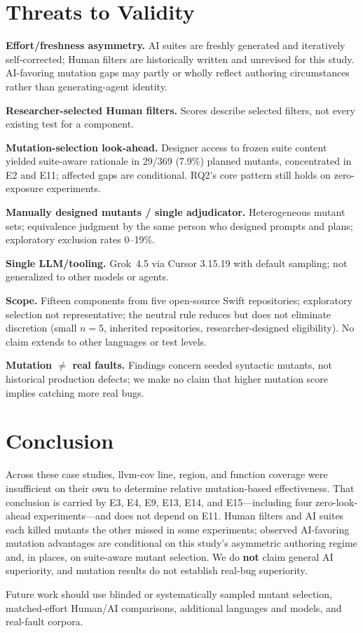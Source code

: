 \documentclass[10pt,conference]{IEEEtran}
\begin{document}
\section{Threats to Validity}
\textbf{Effort/freshness asymmetry.} AI suites are freshly generated and iteratively self-corrected; Human filters are historically written and unrevised for this study. AI-favoring mutation gaps may partly or wholly reflect authoring circumstances rather than generating-agent identity.

\textbf{Researcher-selected Human filters.} Scores describe selected filters, not every existing test for a component.

\textbf{Mutation-selection look-ahead.} Designer access to frozen suite content yielded suite-aware rationale in 29/369 (7.9\%) planned mutants, concentrated in E2 and E11; affected gaps are conditional. RQ2's core pattern still holds on zero-exposure experiments.

\textbf{Manually designed mutants / single adjudicator.} Heterogeneous mutant sets; equivalence judgment by the same person who designed prompts and plans; exploratory exclusion rates 0--19\%.

\textbf{Single LLM/tooling.} Grok~4.5 via Cursor 3.15.19 with default sampling; not generalized to other models or agents.

\textbf{Scope.} Fifteen components from five open-source Swift repositories; exploratory selection not representative; the neutral rule reduces but does not eliminate discretion (small $n{=}5$, inherited repositories, researcher-designed eligibility). No claim extends to other languages or test levels.

\textbf{Mutation $\neq$ real faults.} Findings concern seeded syntactic mutants, not historical production defects; we make no claim that higher mutation score implies catching more real bugs.

\section{Conclusion}
Across these case studies, llvm-cov line, region, and function coverage were insufficient on their own to determine relative mutation-based effectiveness. That conclusion is carried by E3, E4, E9, E13, E14, and E15---including four zero-look-ahead experiments---and does not depend on E11. Human filters and AI suites each killed mutants the other missed in some experiments; observed AI-favoring mutation advantages are conditional on this study's asymmetric authoring regime and, in places, on suite-aware mutant selection. We do \textbf{not} claim general AI superiority, and mutation results do not establish real-bug superiority.

Future work should use blinded or systematically sampled mutant selection, matched-effort Human/AI comparisons, additional languages and models, and real-fault corpora.



\end{document}
